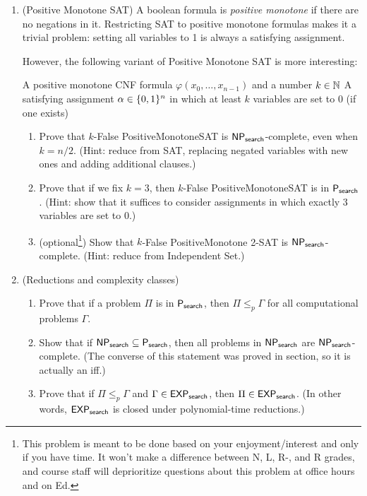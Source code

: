 \documentclass[11pt]{article}
\begin{document}
\begin{enumerate}
    \item (Positive Monotone SAT)
    A boolean formula is {\em positive monotone} if there are no negations in it.  Restricting SAT to positive monotone formulas makes it a trivial problem: setting all variables to 1 is always a satisfying assignment.
    
    However, the following variant of Positive Monotone SAT is more interesting:
    
        {A positive monotone CNF formula $\varphi(x_0,\ldots,x_{n-1})$ and a number $k\in \mathbb{N}$}
        {A satisfying assignment $\alpha\in\{0,1\}^n$ in which at least $k$ variables are set to 0 (if one exists)}
    
    \begin{enumerate}
        \item Prove that $k$-False PositiveMonotoneSAT is $\mathsf{NP_{search}}$-complete, even when $k=n/2$.  (Hint: reduce from SAT, replacing negated variables with new ones and adding additional clauses.)
        \item Prove that if we fix $k=3$, then $k$-False PositiveMonotoneSAT is in $\mathsf{P_{search}}$. (Hint: show that it suffices to consider assignments in which exactly 3 variables are set to 0.)
        \item (optional\footnote{This problem is meant to be done based on your enjoyment/interest and only if you have time. It won't make a difference between N, L, R-, and R grades, and course staff will deprioritize questions about this problem at office hours and on Ed.}) Show that $k$-False PositiveMonotone 2-SAT is $\mathsf{NP_{search}}$-complete.  (Hint: reduce from Independent Set.)
    \end{enumerate}


    \item (Reductions and complexity classes)  
    \begin{enumerate}
        \item Prove that if a problem $\Pi$ is in $\mathsf{P_{search}}$, then $\Pi\leq_p \Gamma$ for all computational problems $\Gamma$.
        \item Show that if $\mathsf{NP_{search}}\subseteq \mathsf{P_{search}}$, then all problems in $\mathsf{NP_{search}}$ are $\mathsf{NP_{search}}$-complete.  (The converse of this statement was proved in section, so it is actually an iff.)  
        \item  Prove that if 
$\Pi\leq_p \Gamma$ and $\Gamma\in \mathsf{EXP_{search}}$, then $\Pi\in \mathsf{EXP_{search}}$. (In other words, $\mathsf{EXP_{search}}$ is closed under polynomial-time reductions.) 
    \end{enumerate}


\end{enumerate}
\end{document}
